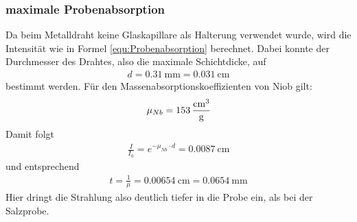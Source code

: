 \documentclass[a4paper,twoside,final]{article}
\begin{document}
\subsubsection{maximale Probenabsorption}
Da beim Metalldraht keine Glaskapillare als Halterung verwendet wurde, wird die Intensität wie in Formel \ref{equ:Probenabsorption} berechnet. Dabei konnte der Durchmesser des Drahtes, also die maximale Schichtdicke, auf
\begin{align}
  d = \SI{0,31}{\milli\meter}=\SI{0,031}{\centi\meter}
\end{align}
bestimmt werden. Für den Massenabsorptionskoeffizienten von Niob gilt:
\begin{align}
  \mu_{Nb}= \SI{153}{\frac{\centi\meter\cubed}{\gram}}
\end{align}
Damit folgt
\begin{align}
  \frac{I}{I_0}=e^{-\mu_{Nb}\cdot d} = \SI{0,0087}{\centi\meter}
\end{align}
und entsprechend
\begin{align}
  t = \frac{1}{\mu} = \SI{0,00654}{\centi\meter} =  \SI{0,0654}{\milli\meter}
\end{align}
Hier dringt die Strahlung also deutlich tiefer in die Probe ein, als bei der Salzprobe.
\end{document}
